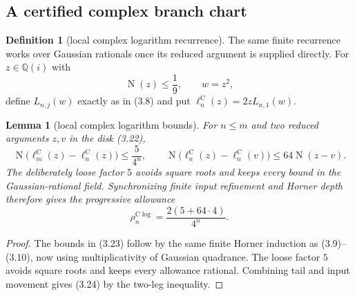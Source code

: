 \documentclass[10pt]{article}
\newtheorem{lemma}[theorem]{Lemma}
\theoremstyle{definition}
\newtheorem{definition}[theorem]{Definition}
\theoremstyle{remark}
\newcommand{\Qi}{\mathbb{Q}(i)}
\newcommand{\Norm}{\operatorname{N}}
\begin{document}
\subsection{A certified complex branch chart}

\begin{definition}[local complex logarithm recurrence]
The same finite recurrence works over Gaussian rationals once its reduced
argument is supplied directly.  For $z\in\Qi$ with
\[
 \Norm(z)\le\frac19,
 \qquad w=z^2,
 \tag{3.22}
\]
define $L_{n,j}(w)$ exactly as in (3.8) and put
$\ell_n^{\mathrm C}(z)=2zL_{n,1}(w)$.
\end{definition}

\begin{lemma}[local complex logarithm bounds]
For $n\le m$ and two reduced arguments $z,v$ in the disk (3.22),
\[
 \Norm\bigl(\ell_m^{\mathrm C}(z)-\ell_n^{\mathrm C}(z)\bigr)
     \le \frac5{4^n},
 \qquad
 \Norm\bigl(\ell_n^{\mathrm C}(z)-\ell_n^{\mathrm C}(v)\bigr)
     \le64\Norm(z-v).
 \tag{3.23}
\]
The deliberately loose factor $5$ avoids square roots and keeps every bound
in the Gaussian-rational field.  Synchronizing finite input refinement and
Horner depth therefore gives the progressive allowance
\[
 \rho_n^{\mathrm C\log}=\frac{2(5+64\cdot4)}{4^n}.
\tag{3.24}
\]
\end{lemma}

\begin{proof}
The bounds in (3.23) follow by the same finite Horner induction as
(3.9)--(3.10), now using multiplicativity of Gaussian quadrance.  The loose
factor $5$ avoids square roots and keeps every allowance rational.
Combining tail and input movement gives (3.24) by the two-leg inequality.
\end{proof}
\end{document}
